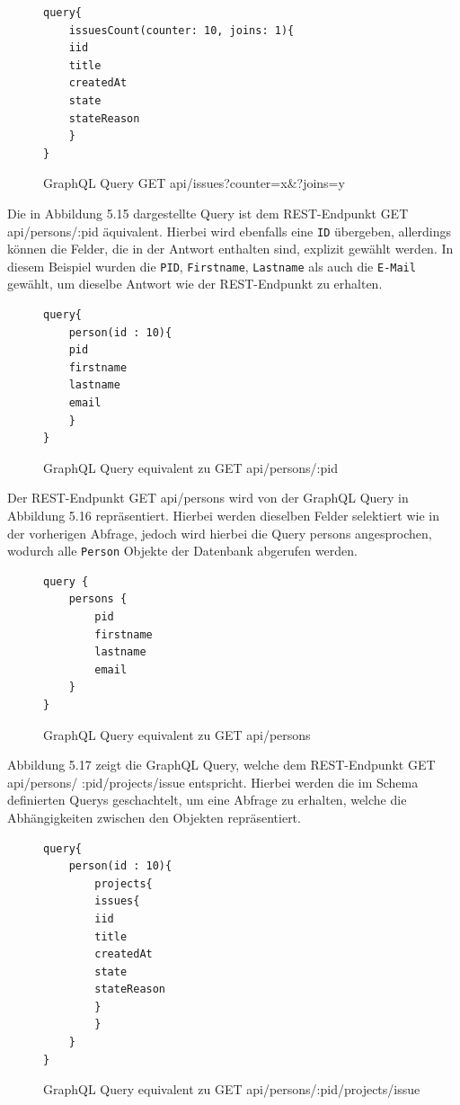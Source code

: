 \begin{figure}[H]
\begin{center}
\begin{BVerbatim}
query{
    issuesCount(counter: 10, joins: 1){
	iid
	title 
	createdAt 
	state 
	stateReason
    }
}
\end{BVerbatim}
\end{center}
\caption{GraphQL Query GET api/issues?counter=x\&?joins=y}
\end{figure}
\noindent
Die in Abbildung 5.15 dargestellte Query ist dem REST-Endpunkt \colorbox{gray!20}{GET api/persons/:pid} äquivalent. Hierbei wird ebenfalls eine \texttt{ID} übergeben, allerdings können die Felder, die in der Antwort enthalten sind, explizit gewählt werden. In diesem Beispiel wurden die  \texttt{PID},  \texttt{Firstname},  \texttt{Lastname} als auch die  \texttt{E-Mail} gewählt, um dieselbe Antwort wie der REST-Endpunkt zu erhalten. 
\begin{figure}[H]
\begin{center}
\begin{BVerbatim}
query{
    person(id : 10){
	pid
	firstname
	lastname
	email
    }
}
\end{BVerbatim}
\end{center}
\caption{GraphQL Query equivalent zu GET api/persons/:pid}
\end{figure}
\noindent
Der REST-Endpunkt \colorbox{gray!20}{GET api/persons} wird von der GraphQL Query in Abbildung 5.16 repräsentiert. Hierbei werden dieselben Felder selektiert wie in der vorherigen Abfrage, jedoch wird hierbei die Query \colorbox{gray!20}{persons} angesprochen, wodurch alle  \texttt{Person} Objekte der Datenbank abgerufen werden.
\begin{figure}[H]
\begin{center}
\begin{BVerbatim}
query {
    persons {
        pid
        firstname
        lastname
        email
    }
}
\end{BVerbatim}
\end{center}
\caption{GraphQL Query equivalent zu GET api/persons}
\end{figure}
\noindent
Abbildung 5.17 zeigt die GraphQL Query, welche dem REST-Endpunkt \colorbox{gray!20}{GET api/persons/} \colorbox{gray!20}{:pid/projects/issue} entspricht. Hierbei werden die im Schema definierten Querys geschachtelt, um eine Abfrage zu erhalten, welche die Abhängigkeiten zwischen den Objekten repräsentiert.
\begin{figure}[H]
\begin{center}
\begin{BVerbatim}
query{
    person(id : 10){
        projects{
	    issues{
		iid
		title
		createdAt
		state
		stateReason
	    }
        }
    }
}
\end{BVerbatim}
\end{center}
\caption{GraphQL Query equivalent zu GET api/persons/:pid/projects/issue}
\end{figure}
